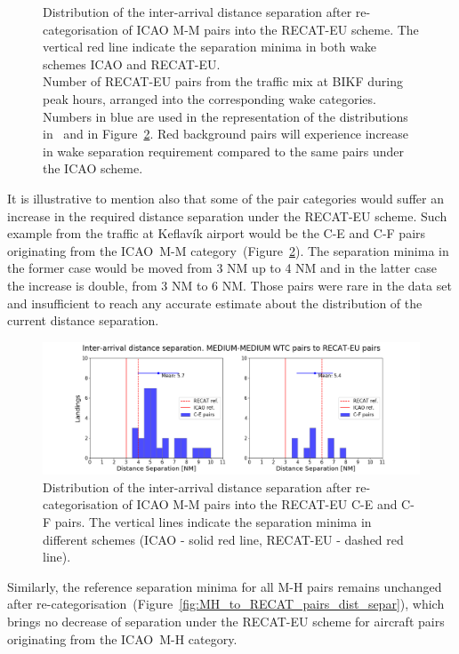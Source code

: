 \begin{figure}[h]
    \caption[Inter-arrival distance separation of ICAO M-M pairs into the RECAT-EU scheme]{\protect{} Distribution of the inter-arrival distance separation after re-categorisation of ICAO M-M pairs into the RECAT-EU scheme. The vertical red line indicate the separation minima in both wake schemes ICAO and RECAT-EU.\\ \protect{} Number of RECAT-EU pairs from the traffic mix at BIKF during peak hours, arranged into the corresponding wake categories. Numbers in blue are used in the representation of the distributions in~\protect{} and in Figure~\ref{fig:MM_to_CE_and_CF_pairs_dist_separ}. Red background pairs will experience increase in wake separation requirement compared to the same pairs under the ICAO scheme.}
    \label{fig:MM_to_RECAT_pairs_dist_separ}
\end{figure}
\clearpage
It is illustrative to mention also that some of the pair categories would suffer an increase in the required distance separation under the RECAT-EU scheme. Such example from the traffic at Keflavík airport would be the C-E and C-F pairs originating from the ICAO~M-M category~(Figure~\ref{fig:MM_to_CE_and_CF_pairs_dist_separ}). The separation minima in the former case would be moved from 3 NM up to 4 NM and in the latter case the increase is double, from 3 NM to 6 NM. Those pairs were rare in the data set and insufficient to reach any accurate estimate about the distribution of the current distance separation. 

\begin{figure}[h]
    \centering
    \includegraphics[width=1\textwidth]{graphics/fig_MM_to_CE_and_CF_pairs_dist_separ.png}
    \caption[Inter-arrival distance separation of ICAO M-M pairs into the RECAT-EU C-F and D-F pairs]{Distribution of the inter-arrival distance separation after re-categorisation of ICAO M-M pairs into the RECAT-EU C-E and C-F pairs. The vertical lines indicate the separation minima in different schemes (ICAO - solid red line, RECAT-EU - dashed red line).}
    \label{fig:MM_to_CE_and_CF_pairs_dist_separ}
\end{figure}
Similarly, the reference separation minima for all M-H pairs remains unchanged after re-categorisation~(Figure~\ref{fig:MH_to_RECAT_pairs_dist_separ}), which brings no decrease of separation under the RECAT-EU scheme for aircraft pairs originating from the ICAO~M-H category. 

